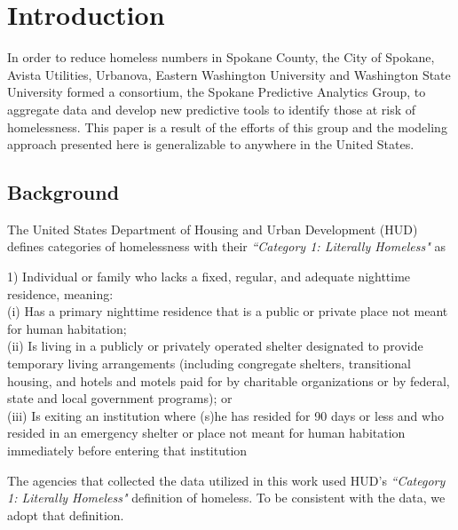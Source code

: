 \documentclass[10pt,letterpaper]{article}
\begin{document}
\section*{Introduction}
In order to reduce homeless numbers in Spokane County, the City of Spokane, Avista Utilities, Urbanova, Eastern Washington University and Washington State University formed a consortium, the Spokane Predictive Analytics Group, to aggregate data and develop new predictive tools to identify those at risk of homelessness. This paper is a result of the efforts of this group and the modeling approach presented here is generalizable to anywhere in the United States.

\subsection*{Background}
The United States Department of Housing and Urban Development (HUD) defines categories of homelessness with their \textit{``Category 1: Literally Homeless"} as
\begin{displayquote}
1) Individual or family who lacks a fixed, regular, and adequate nighttime residence, meaning: \\
(i) Has a primary nighttime residence that is a public or private place not meant for human habitation; \\
(ii) Is living in a publicly or privately operated shelter designated to provide temporary living arrangements (including congregate shelters, transitional housing, and hotels and motels paid for by charitable organizations or by federal, state and local government programs); or \\
(iii) Is exiting an institution where (s)he has resided for 90 days or less and who resided in an emergency shelter or place not meant for human habitation immediately before entering that institution
\end{displayquote}

The agencies that collected the data utilized in this work used HUD's \textit{``Category 1: Literally Homeless"} definition of homeless. To be consistent with the data, we adopt that definition.
\end{document}
